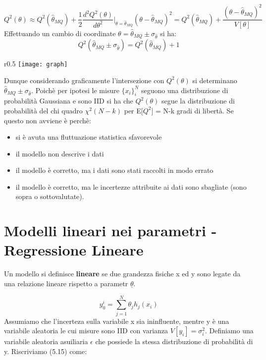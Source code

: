 \begin{equation*}
	Q^2(\theta) \approx Q^2(\hat{\theta}_{MQ}) + \dfrac{1}{2}\dfrac{d^2 Q^2(\theta)}{d\theta^2}\Big \vert_{\theta = \hat{\theta}_{MQ}}(\theta - \hat{\theta}_{MQ})^2 = Q^2(\hat{\theta}_{MQ}) + \dfrac{(\theta - \hat{\theta}_{MQ})^2}{V[\theta]}
\end{equation*}
Effettuando un cambio di coordinate $\theta = \hat{\theta}_{MQ} \pm \sigma_{\hat{\theta}}$ si ha:
\begin{equation*}
	Q^2(\hat{\theta}_{MQ} \pm \sigma_{\hat{\theta}}) = Q^2(\hat{\theta}_{MQ}) + 1
\end{equation*}
\begin{wrapfigure}[8]{r}{0.5 \textwidth}
\centering
\texttt{[image: graph]}	
\end{wrapfigure}
\newline
Dunque considerando graficamente l'intersezione con $Q^2(\theta)$ si determinano $\hat{\theta}_{MQ} \pm \sigma_{\hat{\theta}}$. Poich\`{e} per ipotesi le misure $\{x_i\}_i^N$ seguono una distribuzione di probabilit\`{a} Gaussiana e sono IID si ha che $Q^2(\theta)$ segue la distribuzione di probabilit\`{a} del chi quadro $\chi^2(N-k)$ per E[$Q^2$] = N-k gradi di libert\`{a}. Se questo non avviene \`{e} perch\`{e}:
\begin{itemize}
	\item si \`{e} avuta una fluttuazione statistica sfavorevole
	\item il modello non descrive i dati
	\item il modello \`{e} corretto, ma i dati sono stati raccolti in modo errato
	\item il modello \`{e} corretto, ma le incertezze attribuite ai dati sono sbagliate (sono sopra o sottovalutate).
\end{itemize}

\section{Modelli lineari nei parametri - Regressione Lineare}

Un modello si definisce \textbf{lineare} se due grandezza fisiche x ed y sono legate da una relazione lineare rispetto a parametr $\underline{\theta}$.

\begin{equation}
	y_{0}^{i} = \sum_{j = 1}^N \theta_{j}h_{j}(x_i)
\end{equation}
Assumiamo che l'incerteza sulla variabile x sia ininfluente, mentre y \`{e} una variabile aleatoria le cui misure sono IID con varianza $V[y_i] = \sigma_i^2$. Definiamo una variabile aleatoria asuiliaria $\epsilon$ che possiede la stessa distribuzione di probabilit\`{a} di y. Riscriviamo (5.15) come:

